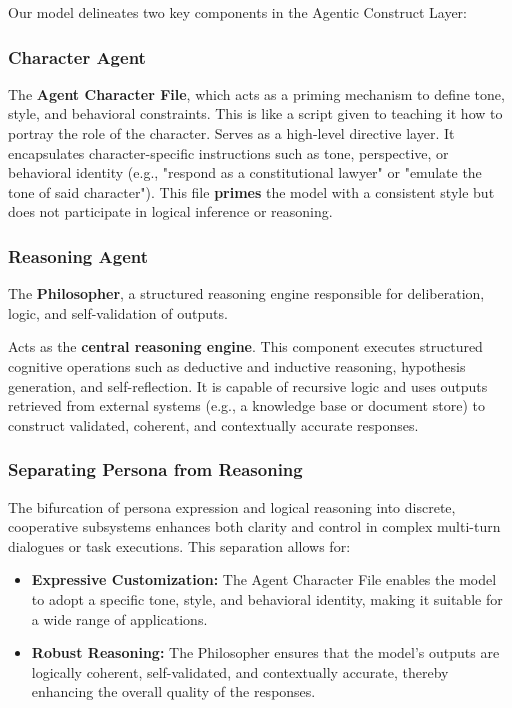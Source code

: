 \documentclass{article}
\begin{document}
Our model delineates two key components in the Agentic Construct Layer:

\subsubsection{Character Agent}
The \textbf{Agent Character File}, which acts as a priming mechanism to define tone, style, and behavioral constraints. This is like a script given to teaching it how to portray the role of the character.
Serves as a high-level directive layer. It encapsulates character-specific instructions such as tone, perspective, or behavioral identity (e.g., "respond as a constitutional lawyer" or "emulate the tone of said character"). This file \textbf{primes} the model with a consistent style but does not participate in logical inference or reasoning.

\subsubsection{Reasoning Agent}
The \textbf{Philosopher}, a structured reasoning engine responsible for deliberation, logic, and self-validation of outputs. 

Acts as the \textbf{central reasoning engine}. This component executes structured cognitive operations such as deductive and inductive reasoning, hypothesis generation, and self-reflection. It is capable of recursive logic and uses outputs retrieved from external systems (e.g., a knowledge base or document store) to construct validated, coherent, and contextually accurate responses. 

\subsubsection{\textbf{Separating Persona from Reasoning}}
The bifurcation of persona expression and logical reasoning into discrete, cooperative subsystems enhances both clarity and control in complex multi-turn dialogues or task executions. This separation allows for:
\begin{itemize}
    \item \textbf{Expressive Customization:} The Agent Character File enables the model to adopt a specific tone, style, and behavioral identity, making it suitable for a wide range of applications.
    \item \textbf{Robust Reasoning:} The Philosopher ensures that the model’s outputs are logically coherent, self-validated, and contextually accurate, thereby enhancing the overall quality of the responses.
\end{itemize}
\end{document}
